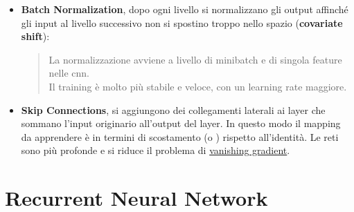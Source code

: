 \begin{note}
    \begin{itemize}
        \item \textbf{Batch Normalization}, dopo ogni livello si normalizzano gli output affinché gli input al livello successivo non si spostino troppo nello spazio (\textbf{covariate shift}):
            \begin{quote}
                La normalizzazione avviene a livello di minibatch e di singola feature nelle \ac{cnn}.
                \\
                Il training è molto più stabile e veloce, con un learning rate maggiore.
            \end{quote}
        \item \textbf{Skip Connections}, si aggiungono dei collegamenti laterali ai layer che sommano l'input originario all'output del layer.
            In questo modo il mapping da apprendere è in termini di scostamento (o ) rispetto all'identità.
            Le reti sono più profonde e si riduce il problema di \hyperref[it:vani-grad]{vanishing gradient}.
    \end{itemize}
\end{note}
%
\section{Recurrent Neural Network}\label{sec:rnn} %

